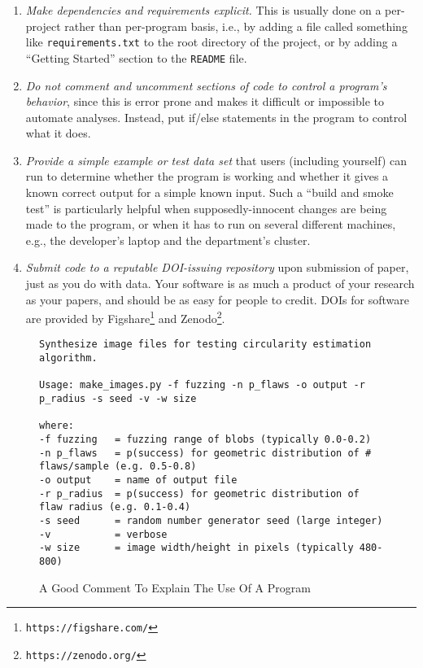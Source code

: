 \documentclass[10pt]{article}
\newcommand{\recommend}[1]{\textit{#1}}
\newcommand{\withurl}[2]{{#1}\footnote{\texttt{#2}}}
\begin{document}
\begin{enumerate}
\begin{quote}
  \end{quote}

\item
  \recommend{Make dependencies and requirements explicit.} This is
  usually done on a per-project rather than per-program basis, i.e.,
  by adding a file called something like \texttt{requirements.txt} to
  the root directory of the project, or by adding a ``Getting
  Started'' section to the \texttt{README} file.

\item
  \recommend{Do not comment and uncomment sections of code to control
    a program's behavior}, since this is error prone and makes it
  difficult or impossible to automate analyses. Instead, put if/else
  statements in the program to control what it does.

\item
  \recommend{Provide a simple example or test data set} that users
  (including yourself) can run to determine whether the program is
  working and whether it gives a known correct output for a
  simple known input. Such a ``build and smoke test'' is particularly
  helpful when supposedly-innocent changes are being made to the
  program, or when it has to run on several different machines, e.g.,
  the developer's laptop and the department's cluster.

\item
  \recommend{Submit code to a reputable DOI-issuing repository} upon
  submission of paper, just as you do with data. Your software is as
  much a product of your research as your papers, and should be as
  easy for people to credit. DOIs for software are provided by
  \withurl{Figshare}{https://figshare.com/} and
  \withurl{Zenodo}{https://zenodo.org/}.

\end{enumerate}

\begin{figure}
\begin{verbatim}
Synthesize image files for testing circularity estimation algorithm.

Usage: make_images.py -f fuzzing -n p_flaws -o output -r p_radius -s seed -v -w size

where:
-f fuzzing   = fuzzing range of blobs (typically 0.0-0.2)
-n p_flaws   = p(success) for geometric distribution of # flaws/sample (e.g. 0.5-0.8)
-o output    = name of output file
-r p_radius  = p(success) for geometric distribution of flaw radius (e.g. 0.1-0.4)
-s seed      = random number generator seed (large integer)
-v           = verbose
-w size      = image width/height in pixels (typically 480-800)
\end{verbatim}
\caption{A Good Comment To Explain The Use Of A Program}
\label{fig:comment}
\end{figure}
\end{document}
